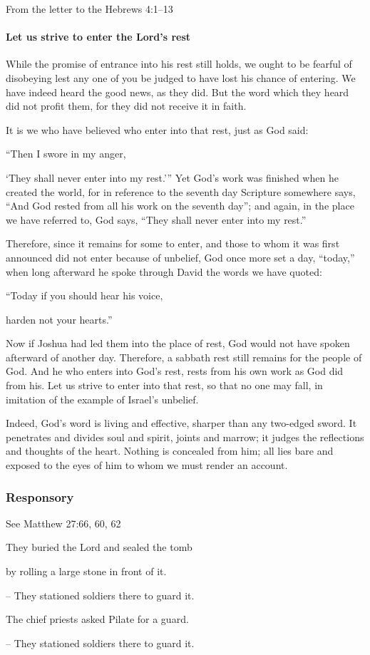 From the letter to the Hebrews \hfill 4:1--13

\paragraph{Let us strive to enter the Lord’s rest}

\lettrine[lines=3]{W}{}hile the promise of entrance into his rest still holds, we ought to be fearful of disobeying lest any one of you be judged to have lost his chance of entering. We have indeed heard the good news, as they did. But the word which they heard did not profit them, for they did not receive it in faith.

It is we who have believed who enter into that rest, just as God said:

\vspace{5pt}
 “Then I swore in my anger,\par
    ‘They shall never enter into my rest.’”
\vspace{5pt}
Yet God’s work was finished when he created the world, for in reference to the seventh day Scripture somewhere says, “And God rested from all his work on the seventh day”; and again, in the place we have referred to, God says, “They shall never enter into my rest.”

Therefore, since it remains for some to enter, and those to whom it was first announced did not enter because of unbelief, God once more set a day, “today,” when long afterward he spoke through David the words we have quoted:

\vspace{5pt}
   “Today if you should hear his voice,\par
      harden not your hearts.”
\vspace{5pt}

Now if Joshua had led them into the place of rest, God would not have spoken afterward of another day. Therefore, a sabbath rest still remains for the people of God. And he who enters into God’s rest, rests from his own work as God did from his. Let us strive to enter into that rest, so that no one may fall, in imitation of the example of Israel’s unbelief.

Indeed, God’s word is living and effective, sharper than any two-edged sword. It penetrates and divides soul and spirit, joints and marrow; it judges the reflections and thoughts of the heart. Nothing is concealed from him; all lies bare and exposed to the eyes of him to whom we must render an account.


\subsubsection{Responsory}
\hfill See Matthew 27:66, 60, 62

They buried the Lord and sealed the tomb\par
by rolling a large stone in front of it.\par
– They stationed soldiers there to guard it.\par
\vspace{5pt}
The chief priests asked Pilate for a guard.\par
– They stationed soldiers there to guard it.
